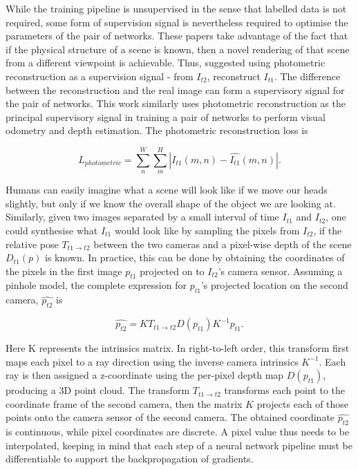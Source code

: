 While the training pipeline is unsupervised in the sense that labelled data is not required, some form of supervision signal is nevertheless required to optimise the parameters of the pair of networks. These papers take advantage of the fact that if the physical structure of a scene is known, then a novel rendering of that scene from a different viewpoint is achievable. Thus, \cite{garg2016unsupervised} suggested using photometric reconstruction as a supervision signal - from $I_{t2}$, reconstruct $I_{t1}$. The difference between the reconstruction and the real image can form a supervisory signal for the pair of networks. This work similarly uses photometric reconstruction as the principal supervisory signal in training a pair of networks to perform visual odometry and depth estimation. The photometric reconstruction loss is


\begin{equation}
    L_{photometric} = \sum_n^W \sum_m^H |I_{t1}(m,n) - \hat{I_{t1}}(m,n)|.
    \label{photometricloss}
\end{equation}


Humans can easily imagine what a scene will look like if we move our heads slightly, but only if we know the overall shape of the object we are looking at. Similarly, given two images separated by a small interval of time $I_{t1}$ and $I_{t2}$, one could synthesise what $I_{t1}$ would look like by sampling the pixels from $I_{t2}$, if the relative pose $T_{t1\rightarrow t2}$ between the two cameras and a pixel-wise depth of the scene $D_{t1}(p)$ is known. In practice, this can be done by obtaining the coordinates of the pixels in the first image $p_{t1}$ projected on to $I_{t2}$'s camera sensor. Assuming a pinhole model, the complete expression for $p_{t1}$'s projected location on the second camera, $\hat{p_{t2}}$ is 

\begin{equation}
\hat{p_{t2}} = KT_{t1\rightarrow t2} D(p_{t1}) K^{-1} p_{t1}.
\end{equation}

Here K represents the intrinsics matrix. In right-to-left order, this transform first maps each pixel to a ray direction using the inverse camera intrinsics $K^{-1}$. Each ray is then assigned a z-coordinate using the per-pixel depth map $D(p_{t1})$, producing a 3D point cloud. The transform $T_{t1 \rightarrow t2}$ transforms each point to the coordinate frame of the second camera, then the matrix $K$ projects each of those points onto the camera sensor of the second camera. The obtained coordinate $\hat{p_{t2}}$ is continuous, while pixel coordinates are discrete. A pixel value thus needs to be interpolated, keeping in mind that each step of a neural network pipeline must be differentiable to support the backpropagation of gradients. 

